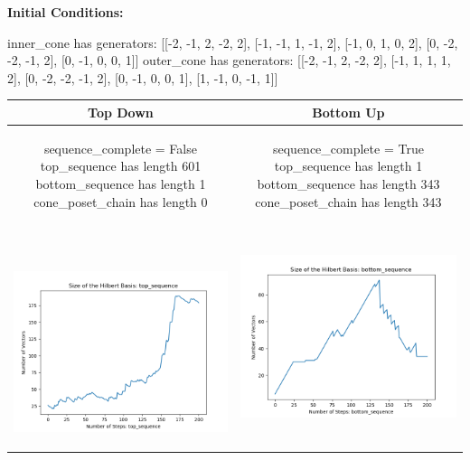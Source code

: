 \documentclass[10pt]{article}
\begin{document}
\textbf{Initial Conditions:}
\begin{SAGE}
inner_cone has generators: 
[[-2, -1, 2, -2, 2], [-1, -1, 1, -1, 2], [-1, 0, 1, 0, 2], [0, -2, -2, -1, 2], [0, -1, 0, 0, 1]]
outer_cone has generators: 
[[-2, -1, 2, -2, 2], [-1, 1, 1, 1, 2], [0, -2, -2, -1, 2], [0, -1, 0, 0, 1], [1, -1, 0, -1, 1]]

\end{SAGE}
\begin{tabular}{c|c}
\textbf{Top Down} & \textbf{Bottom Up} \\ \hline  
\begin{SAGE}
	sequence_complete = False
	top_sequence has length 601
	bottom_sequence has length 1
	cone_poset_chain has length 0
\end{SAGE} 
&
\begin{SAGE}
	sequence_complete = True
	top_sequence has length 1
	bottom_sequence has length 343
	cone_poset_chain has length 343
\end{SAGE} 
\\ \hline
\
\begin{minipage}{.45\textwidth}
\includegraphics[width=\textwidth]{"DATA/5d/5 generators 2 bound F/top_sequence SIZE"}
\end{minipage} &
\begin{minipage}{.45\textwidth}
\includegraphics[width=\textwidth]{"DATA/5d/5 generators 2 bound F bottomup/bottom_sequence SIZE"}

\end{minipage}
\end{tabular}
\end{document}
